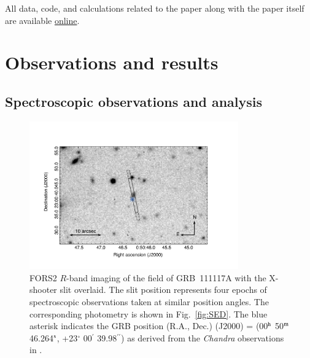 \documentclass[longauth]{aa}    %
\newcommand{\oiii}{[\ion{O}{iii}]}
\begin{document}
All data, code, and calculations related to the paper along with the
paper itself are available \href{https://github.com/jselsing/GRB111117A}{online}.


\section{Observations and results}

\subsection{Spectroscopic observations and analysis}

\begin{figure}
        \centering
       \includegraphics[width=9cm]{figures/GRB111117A_spec_obs.pdf}
        \caption{
        FORS2 $R$-band imaging of the field of GRB~111117A with the X-shooter slit
overlaid. The slit position represents four epochs of spectroscopic observations
taken at similar position angles. The corresponding photometry is shown in
Fig.~\ref{fig:SED}. The blue asterisk indicates the GRB position (R.A., Dec.) (J2000) = (00$^{\rm h}$ 50$^{\rm m}$ 46.264$^{\rm s}$, +23$^{\circ}$ 00$^{\prime}$ 39.98$^{\prime\prime}$) as derived
from the \emph{Chandra} observations in \citet{Sakamoto2013}.
        }
        \label{fig:spec_setup}
\end{figure}

\end{document}
